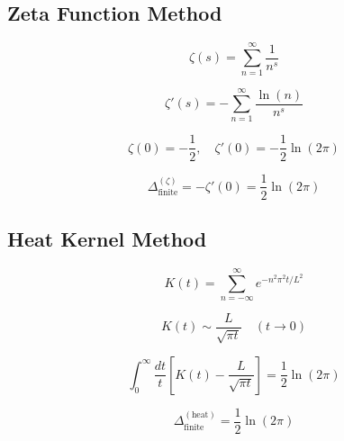 \documentclass[11pt,a4paper]{article}
\theoremstyle{definition}
\begin{document}
\subsection{Zeta Function Method}
\label{subsec:zeta_method}

\begin{equation}
\label{eq:zeta_def}
\zeta(s) = \sum_{n=1}^{\infty}\frac{1}{n^s}
\end{equation}

\begin{equation}
\label{eq:zeta_deriv}
\zeta'(s) = -\sum_{n=1}^{\infty}\frac{\ln(n)}{n^s}
\end{equation}

\begin{equation}
\label{eq:zeta_at_zero}
\zeta(0) = -\frac{1}{2}, \quad \zeta'(0) = -\frac{1}{2}\ln(2\pi)
\end{equation}

\begin{equation}
\label{eq:zeta_finite}
\Delta_{\text{finite}}^{(\zeta)} = -\zeta'(0) = \frac{1}{2}\ln(2\pi)
\end{equation}

\subsection{Heat Kernel Method}
\label{subsec:heat_method}

\begin{equation}
\label{eq:heat_kernel}
K(t) = \sum_{n=-\infty}^{\infty}e^{-n^2\pi^2 t/L^2}
\end{equation}

\begin{equation}
\label{eq:heat_small_t}
K(t) \sim \frac{L}{\sqrt{\pi t}} \quad (t \to 0)
\end{equation}

\begin{equation}
\label{eq:heat_regularized}
\int_0^{\infty}\frac{dt}{t}\left[K(t) - \frac{L}{\sqrt{\pi t}}\right] = \frac{1}{2}\ln(2\pi)
\end{equation}

\begin{equation}
\label{eq:heat_finite}
\Delta_{\text{finite}}^{(\text{heat})} = \frac{1}{2}\ln(2\pi)
\end{equation}
\end{document}

